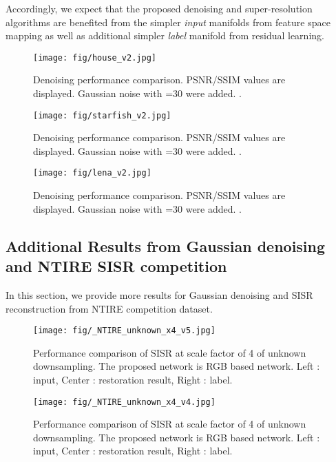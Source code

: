 \documentclass[10pt,twocolumn,letterpaper]{article}
\begin{document}
Accordingly, we expect that the proposed denoising and super-resolution algorithms are benefited from  the simpler \emph{ input} manifolds from feature space mapping
as well as additional simpler {\em label} manifold from residual learning.











\begin{figure*}[!hbt]
\centerline{\texttt{[image: fig/house\_v2.jpg]}} 
\caption{Denoising performance comparison. PSNR/SSIM values are displayed. Gaussian noise with =30 were added. .}
\label{fig:camera}
\end{figure*}
\begin{figure*}[!hbt]

\centerline{\texttt{[image: fig/starfish\_v2.jpg]}} 
\caption{Denoising performance comparison. PSNR/SSIM values are displayed. Gaussian noise with =30 were added. .}
\label{fig:camera2}
\end{figure*}

\begin{figure*}[!hbt]
\centerline{\texttt{[image: fig/lena\_v2.jpg]}} 
\caption{Denoising performance comparison. PSNR/SSIM values are displayed. Gaussian noise with =30 were added. .}
\label{fig:lena}
\end{figure*}
\vspace*{1cm}
\subsection{Additional Results from Gaussian denoising and NTIRE SISR competition}
\label{sec:ph_results_supplementary_GD_SISR_NTIRE}
In this section, we provide more results for Gaussian denoising and SISR reconstruction from NTIRE competition dataset.




\begin{figure*}[!hbt]
\centerline{\texttt{[image: fig/\_NTIRE\_unknown\_x4\_v5.jpg]}}
\caption{Performance comparison of SISR at scale factor of 4 of unknown downsampling. The proposed network is RGB based network. Left : input, Center : restoration result, Right : label. }
\label{fig:SISR_compare_NTIRE_unknown_v1}
\end{figure*}

\begin{figure*}[!hbt]
\centerline{\texttt{[image: fig/\_NTIRE\_unknown\_x4\_v4.jpg]}}
\caption{Performance comparison of SISR at scale factor of 4 of unknown downsampling. The proposed network is RGB based network. Left : input, Center : restoration result, Right : label. }
\label{fig:SISR_compare_NTIRE_unknown_v4}
\end{figure*}
\end{document}
